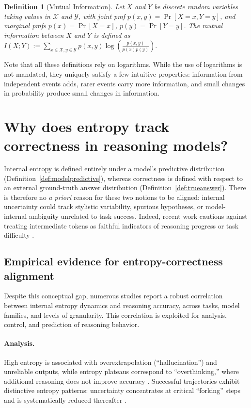 \documentclass{article}
\newtheorem{definition}{Definition}
\begin{document}
\begin{definition}[Mutual Information]
    Let $X$ and $Y$ be discrete random variables taking values in $\mathcal{X}$ and $\mathcal{Y}$, with joint pmf $p(x,y)=\Pr[X=x,Y=y]$, and marginal pmfs $p(x)=\Pr[X=x]$, $p(y)=\Pr[Y=y]$. The \emph{mutual information between $X$ and $Y$} is defined as $I(X;Y):=\sum_{x\in\mathcal{X}, y\in \mathcal{Y}}p(x,y)\log\left(\frac{p(x,y)}{p(x)p(y)}\right).$
\end{definition}

Note that all these definitions rely on logarithms. While the use of logarithms is not mandated, they uniquely satisfy a few intuitive properties: information from independent events adds, rarer events carry more information, and small changes in probability produce small changes in information.

\section{Why does entropy track correctness in reasoning models?}
\label{sec:entropy-correctness_puzzle}

Internal entropy is defined entirely under a model’s predictive distribution (Definition~\ref{def:modelpredictive}), whereas correctness is defined with respect to an external ground-truth answer distribution (Definition~\ref{def:trueanswer}). There is therefore no \textit{a priori} reason for these two notions to be aligned: internal uncertainty could track stylistic variability, spurious hypotheses, or model-internal ambiguity unrelated to task success. Indeed, recent work cautions against treating intermediate tokens as faithful indicators of reasoning progress or task difficulty \cite{kambhampati2025stopanthropomorphizingintermediatetokens, palod2025performativethinkingbrittlecorrelation}.

\subsection{Empirical evidence for entropy-correctness alignment}

Despite this conceptual gap, numerous studies report a robust correlation between internal entropy dynamics and reasoning accuracy, across tasks, model families, and levels of granularity. This correlation is exploited for analysis, control, and prediction of reasoning behavior.

\paragraph{Analysis.}
High entropy is associated with overextrapolation (``hallucination'') and unreliable outputs, while entropy plateaus correspond to ``overthinking,'' where additional reasoning does not improve accuracy \cite{farquhar_detecting_2024}. Successful trajectories exhibit distinctive entropy patterns: uncertainty concentrates at critical “forking” steps and is systematically reduced thereafter \cite{qian2025demystifyingreasoningdynamicsmutual, wang20258020rulehighentropyminority}.
\end{document}
